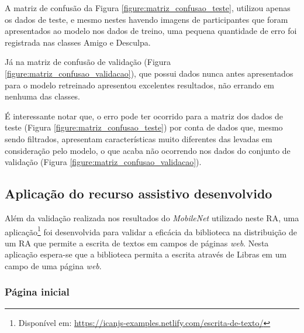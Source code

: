 \par A matriz de confusão da Figura \ref{figure:matriz_confusao_teste}, utilizou apenas os dados de teste, e mesmo nestes havendo imagens de participantes que foram apresentados ao modelo nos dados de treino, uma pequena quantidade de erro foi registrada nas classes Amigo e Desculpa.


\par Já na matriz de confusão de validação (Figura \ref{figure:matriz_confusao_validacao}), que possui dados nunca antes apresentados para o modelo retreinado apresentou excelentes resultados, não errando em nenhuma das classes.


\par É interessante notar que, o erro pode ter ocorrido para a matriz dos dados de teste (Figura \ref{figure:matriz_confusao_teste}) por conta de dados que, mesmo sendo filtrados, apresentam características muito diferentes das levadas em consideração pelo modelo, o que acaba não ocorrendo nos dados do conjunto de validação (Figura \ref{figure:matriz_confusao_validacao}).

\subsection{Aplicação do recurso assistivo desenvolvido}

\par Além da validação realizada nos resultados do \textit{MobileNet} utilizado neste RA, uma aplicação\footnote{Disponível em: \url{https://icanjs-examples.netlify.com/escrita-de-texto/}} foi desenvolvida para validar a eficácia da biblioteca na distribuição de um RA que permite a escrita de textos em campos de páginas \textit{web}. Nesta aplicação espera-se que a biblioteca permita a escrita através de Libras em um campo de uma página \textit{web}.

\subsubsection{Página inicial}

